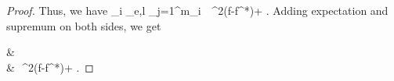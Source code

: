 \documentclass[twoside,11pt]{article}
\makeatletter
\newcommand{\discardlabel}[1]{}
\newcommand{\discardtwo}[2]{}
\newcommand{\legacyref}[1]{\textup{[source ref.]}}
\newcommand{\legacyeqref}[1]{\textup{[source equation]}}
\newenvironment{legacycomparison}{%
  \begingroup\color{legacygray}%
  \let\label\discardlabel
  \let\originallabel\discardlabel
  \let\ref\legacyref
  \let\pageref\legacyref
  \let\eqref\legacyeqref
  \let\cref\legacyref
  \let\Cref\legacyref
  \let\autoref\legacyref
  \let\aliasref\discardtwo
}{\endgroup}
\newcommand{\aliasref}[2]{%
  \@ifundefined{r@#2}{}{%
    \expandafter\let\csname r@#1\expandafter\endcsname\csname r@#2\endcsname}}
\makeatother
\begin{document}
\begin{legacycomparison}
\begin{proof}
Thus, we have 
\bea 
{}\sum_{i \in {}_{e,l}} \sum_{j=1}^{m_{i}} \,\leq\,   \Delta^2(f-f^*)+ . 
\bea 
Adding expectation and supremum on both sides, we get  
\beq
\label{b_in_1144}
& \nonumber\\
&\quad \,\leq\,   \Delta^2(f-f^*)+ .
\beq 
\end{proof}







\end{legacycomparison}
\end{document}
